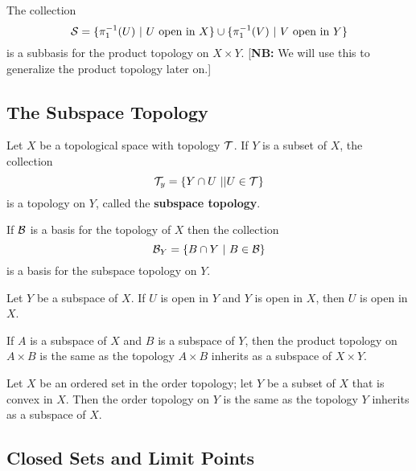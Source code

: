  The collection 
\[\CS = \{\pi_1\inv(U)\ |\ U \text{ open in } X\}\cup \{\pi_1\inv(V)\ |\ V \text{ open in } Y\}\]
is a subbasis for the product topology on $X\times Y$. [\textbf{NB:} We will use this to generalize the product topology later on.]

\subsection{The Subspace Topology}\nl
\setcounter{section}{16}

\vs

\dfn Let $X$ be a topological space with topology $\mathcal{T}$. If $Y$ is a subset of $X$, the collection
\[\mathcal{T}_y = \{Y\cap U\ || U\in \mathcal{T}\}\]
is a topology on $Y$, called the \textbf{subspace topology}.

\vs

\begin{lem}
If $\mathcal{B}$ is a basis for the topology of $X$ then the collection 
\[\BB_Y = \{B\cap Y\ |\ B\in \BB\}\]
is a basis for the subspace topology on $Y$.
\end{lem}

\vs

\begin{lem}
Let $Y$ be a subspace of $X$. If $U$ is open in $Y$ and $Y$ is open in $X$, then $U$ is open in $X$.
\end{lem}

\vs

\begin{thm}
If $A$ is a subspace of $X$ and $B$ is a subspace of $Y$, then the product topology on $A\times B$ is the same as the topology $A\times B$ inherits as a subspace of $X\times Y$.
\end{thm}

\vs

\begin{thm}
Let $X$ be an ordered set in the order topology; let $Y$ be a subset of $X$ that is convex in $X$. Then the order topology on $Y$ is the same as the topology $Y$ inherits as a subspace of $X$.
\end{thm}

\subsection{Closed Sets and Limit Points}\nl
\setcounter{section}{17}
\setcounter{thm}{0}

